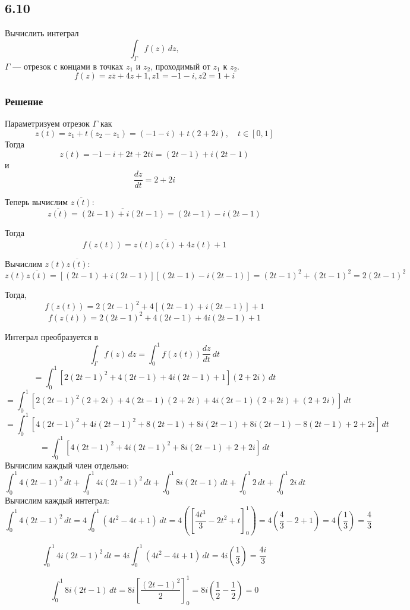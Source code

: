 \documentclass[12pt,a4paper]{article}
\begin{document}
\subsection*{6.10}
Вычислить интеграл
\[
\int_\Gamma f(z) \, dz,
\]
$\Gamma$ --- отрезок с концами в точках \( z_1 \) и \( z_2 \), проходимый от \( z_1 \) к \( z_2 \).
\[
f(z)=z\overline{z}+4z+1, z1=-1-i,z2=1+i
\]
\subsubsection*{Решение}
Параметризуем отрезок \(\Gamma\) как
\[
z(t) = z_1 + t(z_2 - z_1) = (-1 - i) + t(2 + 2i), \quad t \in [0, 1]
\]
Тогда
\[
z(t) = -1 - i + 2t + 2ti = (2t - 1) + i(2t - 1)
\]
и
\[
\frac{dz}{dt} = 2 + 2i
\]

Теперь вычислим \(\overline{z(t)}\):
\[
\overline{z(t)} = \overline{(2t - 1) + i(2t - 1)} = (2t - 1) - i(2t - 1)
\]

Тогда
\[
f(z(t)) = z(t)\overline{z(t)} + 4z(t) + 1
\]

Вычислим \(z(t)\overline{z(t)}\):
\[
z(t)\overline{z(t)} = [(2t - 1) + i(2t - 1)][(2t - 1) - i(2t - 1)] = (2t - 1)^2 + (2t - 1)^2 = 2(2t - 1)^2
\]

Тогда,
\[
f(z(t)) = 2(2t - 1)^2 + 4[(2t - 1) + i(2t - 1)] + 1
\]
\[
f(z(t)) = 2(2t - 1)^2 + 4(2t - 1) + 4i(2t - 1) + 1
\]

Интеграл преобразуется в
\[
\int_\Gamma f(z) \, dz = \int_0^1 f(z(t)) \frac{dz}{dt} \, dt
\]
\[
= \int_0^1 [2(2t - 1)^2 + 4(2t - 1) + 4i(2t - 1) + 1](2 + 2i) \, dt
\]
\[
= \int_0^1 [2(2t - 1)^2(2 + 2i) + 4(2t - 1)(2 + 2i) + 4i(2t - 1)(2 + 2i) + (2 + 2i)] \, dt
\]
\[
= \int_0^1 \left[4(2t - 1)^2 + 4i(2t - 1)^2 + 8(2t - 1) + 8i(2t - 1) + 8i(2t - 1) - 8(2t - 1) + 2 + 2i \right] \, dt
\]
\[
= \int_0^1 \left[ 4(2t - 1)^2 + 4i(2t - 1)^2 + 8i(2t - 1) + 2 + 2i \right] \, dt
\]
Вычислим каждый член отдельно:
\[
\int_0^1 4(2t - 1)^2 \, dt + \int_0^1 4i(2t - 1)^2 \, dt + \int_0^1 8i(2t - 1) \, dt + \int_0^1 2 \, dt + \int_0^1 2i \, dt
\]
Вычислим каждый интеграл:
\[
\int_0^1 4(2t - 1)^2 \, dt = 4 \int_0^1 (4t^2 - 4t + 1) \, dt = 4 \left( \left[ \frac{4t^3}{3} - 2t^2 + t \right]_0^1 \right) = 4 \left( \frac{4}{3} - 2 + 1 \right) = 4 \left( \frac{1}{3} \right) = \frac{4}{3}
\]

\[
\int_0^1 4i(2t - 1)^2 \, dt = 4i \int_0^1 (4t^2 - 4t + 1) \, dt = 4i \left( \frac{1}{3} \right) = \frac{4i}{3}
\]

\[
\int_0^1 8i(2t - 1) \, dt = 8i \left[ \frac{(2t - 1)^2}{2} \right]_0^1 = 8i \left( \frac{1}{2} - \frac{1}{2} \right) = 0
\]
\end{document}
